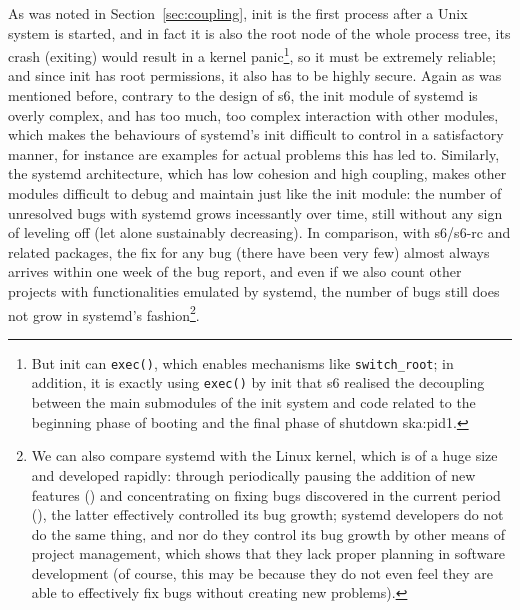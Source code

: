 As was noted in Section~\ref{sec:coupling}, init is the first process after a
Unix system is started, and in fact it is also the root node of the whole
process tree, its crash (exiting) would result in a kernel panic\footnote{But
init can \texttt{exec()}, which enables mechanisms like \texttt{switch\_root};
in addition, it is exactly using \texttt{exec()} by init that s6 realised the
decoupling between the main submodules of the init system and code related to
the beginning phase of booting and the final phase of shutdown\cupercite%
{ska:pid1}.}, so it must be extremely reliable; and since init has root
permissions, it also has to be highly secure.  Again as was mentioned before,
contrary to the design of s6, the init module of systemd is overly complex,
and has too much, too complex interaction with other modules, which makes
the behaviours of systemd's init difficult to control in a satisfactory
manner, for instance \parencite{ayer2016, edge2017} are examples for actual
problems this has led to.  Similarly, the systemd architecture, which has
low cohesion and high coupling, makes other modules difficult to debug and
maintain just like the init module: the number of unresolved bugs with systemd
grows incessantly over time, still without any sign of leveling off (let alone
sustainably decreasing).  In comparison, with s6/s6-rc
and related packages, the fix for any bug (there have been very few) almost
always arrives within one week of the bug report, and even if we also count
other projects with functionalities emulated by systemd, the number of bugs
still does not grow in systemd's fashion\footnote{We can also compare systemd
with the Linux kernel, which is of a huge size and developed rapidly: through
periodically pausing the addition of new features ()
and concentrating on fixing bugs discovered in the current period (), the latter effectively controlled its bug growth; systemd developers
do not do the same thing, and nor do they control its bug growth by other means
of project management, which shows that they lack proper planning in software
development (of course, this may be because they do not even feel they are
able to effectively fix bugs without creating new problems).}.

